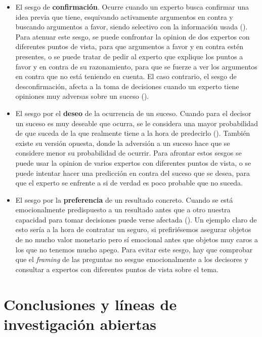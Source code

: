 \documentclass[a4paper,11pt]{article}
\begin{document}
\begin{itemize}

\item El sesgo de \textbf{confirmación}. Ocurre cuando un experto busca confirmar una idea previa que tiene, esquivando activamente argumentos en contra y buscando argumentos a favor, siendo selectivo con la información usada (\cite{correia2011}). Para atenuar este sesgo, se puede confrontar la opinion de dos expertos con diferentes puntos de vista, para que argumentos a favor y en contra estén presentes, o se puede tratar de pedir al experto que explique los puntos a favor y en contra de su razonamiento, para que se fuerze a ver los argumentos en contra que no está teniendo en cuenta. El caso contrario, el sesgo de desconfirmación, afecta a la toma de decisiones cuando un experto tiene opiniones muy adversas sobre un suceso (\cite{taber2009}).

\item El sesgo por el \textbf{deseo} de la ocurrencia de un suceso. Cuando para el decisor un suceso es muy deseable que ocurra, se le considera una mayor probabilidad de que suceda de la que realmente tiene a la hora de predecirlo (\cite{krizan2007}). También existe su versión opuesta, donde la adversión a un suceso hace que se considere menor su probabilidad de ocurrir. Para afrontar estos sesgos se puede usar la opinion de varios expertos con diferentes puntos de vista, o se puede intentar hacer una predicción en contra del suceso que se desea, para que el experto se enfrente a si de verdad es poco probable que no suceda.

\item El sesgo por la \textbf{preferencia} de un resultado concreto. Cuando se está emocionalmente predispuesto a un resultado antes que a otro nuestra capacidad para tomar decisiones puede verse afectada (\cite{slovic2004}). Un ejemplo claro de esto sería a la hora de contratar un seguro, si prefiriésemos asegurar objetos de no mucho valor monetario pero sí emocional antes que objetos muy caros a los que no tenemos mucho apego. Para evitar este sesgo, hay que comprobar que el \textit{framing} de las preguntas no sesgue emocionalmente a los decisores y consultar a expertos con diferentes puntos de vista sobre el tema.

\end{itemize}

\section{Conclusiones y líneas de investigación abiertas}
\end{document}
